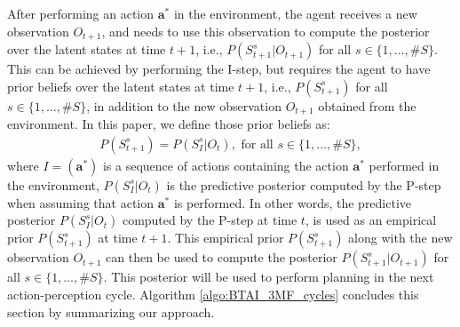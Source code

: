 \documentclass[twoside,11pt]{article}
\newcommand{\nb}[1]{\# #1}
\begin{document}
After performing an action $\bm{a}^*$ in the environment, the agent receives a new observation $O_{t+1}$, and needs to use this observation to compute the posterior over the latent states at time $t+1$, i.e., $P(S^s_{t+1}|O_{t+1})$ for all $s \in \{1, \hdots, \nb{S}\}$. This can be achieved by performing the I-step, but requires the agent to have prior beliefs over the latent states at time $t+1$, i.e., $P(S^s_{t+1})$ for all $s \in \{1, \hdots, \nb{S}\}$, in addition to the new observation $O_{t+1}$ obtained from the environment. In this paper, we define those prior beliefs as:
\begin{align*}
P(S^s_{t+1}) = P(S_{I}^s|O_t), \text{ for all } s \in \{1, \hdots, \nb{S}\},
\end{align*}
where $I = (\bm{a}^*)$ is a sequence of actions containing the action $\bm{a}^*$ performed in the environment, $P(S_I^s|O_t)$ is the predictive posterior computed by the P-step when assuming that action $\bm{a}^*$ is performed. In other words, the predictive posterior $P(S_I^s|O_t)$ computed by the P-step at time $t$, is used as an empirical prior $P(S^s_{t+1})$ at time $t+1$. This empirical prior $P(S^s_{t+1})$ along with the new observation $O_{t+1}$ can then be used to compute the posterior $P(S^s_{t+1}|O_{t+1})$ for all $s \in \{1, \hdots, \nb{S}\}$. This posterior will be used to perform planning in the next action-perception cycle. Algorithm \ref{algo:BTAI_3MF_cycles} concludes this section by summarizing our approach.
\end{document}
